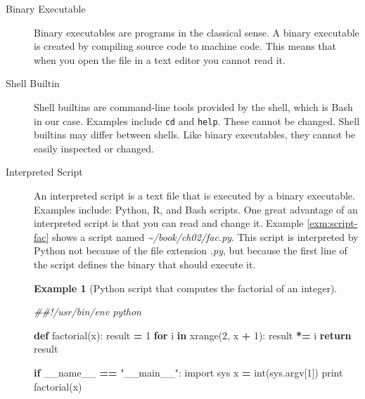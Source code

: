 \documentclass[
]{book}
\newenvironment{Shaded}{\begin{snugshade}}{\end{snugshade}}
\newcommand{\BuiltInTok}[1]{#1}
\newcommand{\CommentTok}[1]{\textcolor[rgb]{0.56,0.35,0.01}{\textit{#1}}}
\newcommand{\ControlFlowTok}[1]{\textcolor[rgb]{0.13,0.29,0.53}{\textbf{#1}}}
\newcommand{\DecValTok}[1]{\textcolor[rgb]{0.00,0.00,0.81}{#1}}
\newcommand{\ImportTok}[1]{#1}
\newcommand{\KeywordTok}[1]{\textcolor[rgb]{0.13,0.29,0.53}{\textbf{#1}}}
\newcommand{\NormalTok}[1]{#1}
\newcommand{\OperatorTok}[1]{\textcolor[rgb]{0.81,0.36,0.00}{\textbf{#1}}}
\newcommand{\StringTok}[1]{\textcolor[rgb]{0.31,0.60,0.02}{#1}}
\newcommand{\VariableTok}[1]{\textcolor[rgb]{0.00,0.00,0.00}{#1}}
\theoremstyle{definition}
\theoremstyle{definition}
\newtheorem{example}{Example}[chapter]
\theoremstyle{definition}
\theoremstyle{remark}
\begin{document}
\begin{description}
\item[Binary Executable]
Binary executables are programs in the classical sense. A binary executable is created by compiling source code to machine code. This means that when you open the file in a text editor you cannot read it.
\item[Shell Builtin]
Shell builtins are command-line tools provided by the shell, which is Bash in our case. Examples include \texttt{cd} and \texttt{help}. These cannot be changed. Shell builtins may differ between shells. Like binary executables, they cannot be easily inspected or changed.
\item[Interpreted Script]
An interpreted script is a text file that is executed by a binary executable. Examples include: Python, R, and Bash scripts. One great advantage of an interpreted script is that you can read and change it. Example \ref{exm:script-fac} shows a script named \emph{\textasciitilde{}/book/ch02/fac.py}. This script is interpreted by Python not because of the file extension \emph{.py}, but because the first line of the script defines the binary that should execute it.

\begin{example}[Python script that computes the factorial of an integer]
\protect\hypertarget{exm:script-fac}{}{\label{exm:script-fac} {} }
\end{example}

\begin{Shaded}
\begin{Highlighting}[]
\CommentTok{##!/usr/bin/env python}

\KeywordTok{def}\NormalTok{ factorial(x):}
\NormalTok{    result }\OperatorTok{=} \DecValTok{1}
    \ControlFlowTok{for}\NormalTok{ i }\KeywordTok{in} \BuiltInTok{xrange}\NormalTok{(}\DecValTok{2}\NormalTok{, x }\OperatorTok{+} \DecValTok{1}\NormalTok{):}
\NormalTok{        result }\OperatorTok{*=}\NormalTok{ i}
    \ControlFlowTok{return}\NormalTok{ result}

\ControlFlowTok{if} \VariableTok{__name__} \OperatorTok{==} \StringTok{"__main__"}\NormalTok{:}
    \ImportTok{import}\NormalTok{ sys}
\NormalTok{    x }\OperatorTok{=} \BuiltInTok{int}\NormalTok{(sys.argv[}\DecValTok{1}\NormalTok{])}
    \BuiltInTok{print}\NormalTok{ factorial(x)}
\end{Highlighting}
\end{Shaded}


\end{description}
\end{document}
